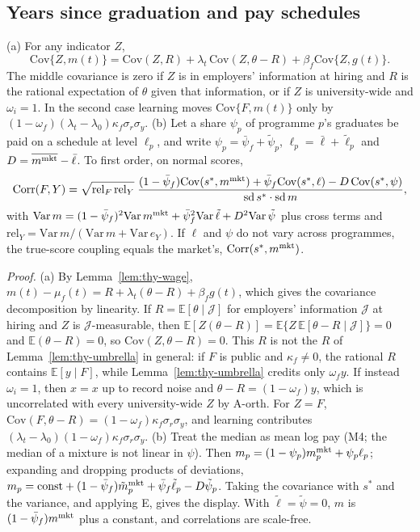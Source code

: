 \subsection{Years since graduation and pay schedules}\label{app:thy:p3}

\begin{thyaprop}\label{prop:thy-time}
(a) For any indicator $Z$,
\[
\mathrm{Cov}\{Z,m(t)\}=\mathrm{Cov}(Z,R)+\lambda_t\,\mathrm{Cov}(Z,\theta-R)+\beta_f\mathrm{Cov}\{Z,g(t)\}.
\]
The middle covariance is zero if $Z$ is in employers' information at hiring and $R$ is the rational expectation of
$\theta$ given that information, or if $Z$ is university-wide and $\omega_i=1$. In the second case learning moves
$\mathrm{Cov}\{F,m(t)\}$ only by $(1-\omega_f)(\lambda_t-\lambda_0)\kappa_f\sigma_r\sigma_y$.
(b) Let a share $\psi_p$ of programme $p$'s graduates be paid on a schedule at level $\ell_p$, and write
$\psi_p=\bar\psi_f+\tilde\psi_p$, $\ell_p=\bar\ell+\tilde\ell_p$ and $D=\overline{m^{\rm mkt}}-\bar\ell$. To first
order, on normal scores,
\[
\mathrm{Corr}(F,Y)=\sqrt{\mathrm{rel}_F\,\mathrm{rel}_Y}\;
\frac{(1-\bar\psi_f)\mathrm{Cov}(s^*,m^{\rm mkt})+\bar\psi_f\mathrm{Cov}(s^*,\ell)-D\,\mathrm{Cov}(s^*,\psi)}
{\mathrm{sd}\,s^*\cdot\mathrm{sd}\,m},
\]
with $\mathrm{Var}\,m=(1-\bar\psi_f)^2\mathrm{Var}\,m^{\rm mkt}+\bar\psi_f^2\mathrm{Var}\,\tilde\ell+D^2\mathrm{Var}\,\tilde\psi$
plus cross terms and $\mathrm{rel}_Y=\mathrm{Var}\,m/(\mathrm{Var}\,m+\mathrm{Var}\,e_Y)$. If $\ell$ and $\psi$ do not
vary across programmes, the true-score coupling equals the market's, $\mathrm{Corr}(s^*,m^{\rm mkt})$.
\end{thyaprop}

\emph{Proof.} (a) By Lemma~\ref{lem:thy-wage}, $m(t)-\mu_f(t)=R+\lambda_t(\theta-R)+\beta_fg(t)$, which gives the
covariance decomposition by linearity. If $R=\mathbb E[\theta\mid\mathcal J]$ for employers' information $\mathcal J$
at hiring and $Z$ is $\mathcal J$-measurable, then $\mathbb E[Z(\theta-R)]=\mathbb E\{Z\,\mathbb E[\theta-R\mid
\mathcal J]\}=0$ and $\mathbb E(\theta-R)=0$, so $\mathrm{Cov}(Z,\theta-R)=0$. This $R$ is not the $R$ of
Lemma~\ref{lem:thy-umbrella} in general: if $F$ is public and $\kappa_f\neq0$, the rational $R$ contains
$\mathbb E[y\mid F]$, while Lemma~\ref{lem:thy-umbrella} credits only $\omega_fy$. If instead $\omega_i=1$, then
$\hat x=x$ up to record noise and $\theta-R=(1-\omega_f)y$, which is uncorrelated with every university-wide $Z$ by
A-orth. For $Z=F$, $\mathrm{Cov}(F,\theta-R)=(1-\omega_f)\kappa_f\sigma_r\sigma_y$, and learning contributes
$(\lambda_t-\lambda_0)(1-\omega_f)\kappa_f\sigma_r\sigma_y$. (b) Treat the median as mean log pay (M4; the median of a
mixture is not linear in $\psi$). Then $m_p=(1-\psi_p)m^{\rm mkt}_p+\psi_p\ell_p$; expanding and dropping products of
deviations, $m_p=\text{const}+(1-\bar\psi_f)\tilde m^{\rm mkt}_p+\bar\psi_f\tilde\ell_p-D\tilde\psi_p$. Taking the
covariance with $s^*$ and the variance, and applying E, gives the display. With $\tilde\ell=\tilde\psi=0$,
$m$ is $(1-\bar\psi_f)m^{\rm mkt}$ plus a constant, and correlations are scale-free. \thyqed

